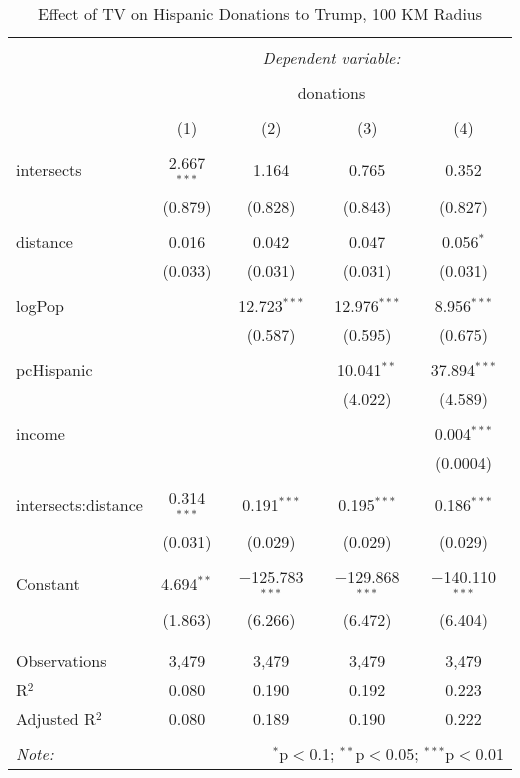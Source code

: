 
\begin{table}[!htbp] \centering 
  \caption{Effect of TV on Hispanic Donations to Trump, 100 KM Radius} 
  \label{} 
\begin{tabular}{@{\extracolsep{-5pt}}lcccc} 
\\[-1.8ex]\hline 
\hline \\[-1.8ex] 
 & \multicolumn{4}{c}{\textit{Dependent variable:}} \\ 
\cline{2-5} 
\\[-1.8ex] & \multicolumn{4}{c}{donations} \\ 
\\[-1.8ex] & (1) & (2) & (3) & (4)\\ 
\hline \\[-1.8ex] 
 intersects & 2.667$^{***}$ & 1.164 & 0.765 & 0.352 \\ 
  & (0.879) & (0.828) & (0.843) & (0.827) \\ 
  & & & & \\ 
 distance & 0.016 & 0.042 & 0.047 & 0.056$^{*}$ \\ 
  & (0.033) & (0.031) & (0.031) & (0.031) \\ 
  & & & & \\ 
 logPop &  & 12.723$^{***}$ & 12.976$^{***}$ & 8.956$^{***}$ \\ 
  &  & (0.587) & (0.595) & (0.675) \\ 
  & & & & \\ 
 pcHispanic &  &  & 10.041$^{**}$ & 37.894$^{***}$ \\ 
  &  &  & (4.022) & (4.589) \\ 
  & & & & \\ 
 income &  &  &  & 0.004$^{***}$ \\ 
  &  &  &  & (0.0004) \\ 
  & & & & \\ 
 intersects:distance & 0.314$^{***}$ & 0.191$^{***}$ & 0.195$^{***}$ & 0.186$^{***}$ \\ 
  & (0.031) & (0.029) & (0.029) & (0.029) \\ 
  & & & & \\ 
 Constant & 4.694$^{**}$ & $-$125.783$^{***}$ & $-$129.868$^{***}$ & $-$140.110$^{***}$ \\ 
  & (1.863) & (6.266) & (6.472) & (6.404) \\ 
  & & & & \\ 
\hline \\[-1.8ex] 
Observations & 3,479 & 3,479 & 3,479 & 3,479 \\ 
R$^{2}$ & 0.080 & 0.190 & 0.192 & 0.223 \\ 
Adjusted R$^{2}$ & 0.080 & 0.189 & 0.190 & 0.222 \\ 
\hline 
\hline \\[-1.8ex] 
\textit{Note:}  & \multicolumn{4}{r}{$^{*}$p$<$0.1; $^{**}$p$<$0.05; $^{***}$p$<$0.01} \\ 
\end{tabular} 
\end{table} 
